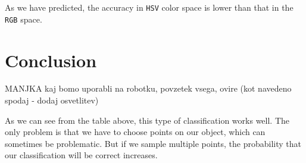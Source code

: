 \documentclass[12pt,a4paper]{article}
\begin{document}
	As we have predicted, the accuracy in \texttt{HSV} color space is lower than that in the \texttt{RGB} space. \\
	
	

	
	\section{Conclusion}

	MANJKA kaj bomo uporabli na robotku, povzetek vsega, ovire (kot navedeno spodaj - dodaj osvetlitev)
	
	As we can see from the table above, this type of classification works well. The only problem is that we have to choose points on our object, which can sometimes be problematic. But if we sample multiple points, the probability that our classification will be correct increases.
	
	
\end{document}
